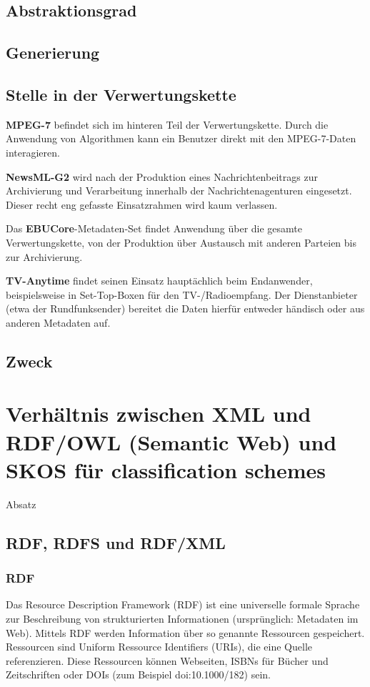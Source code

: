 	\subsection{Abstraktionsgrad}
	\subsection{Generierung}

	\subsection{Stelle in der Verwertungskette}
	\textbf{MPEG-7} befindet sich im hinteren Teil der Verwertungskette. Durch die Anwendung von Algorithmen kann ein Benutzer direkt mit den MPEG-7-Daten interagieren.
	
	\textbf{NewsML-G2} wird nach der Produktion eines Nachrichtenbeitrags zur Archivierung und Verarbeitung innerhalb der Nachrichtenagenturen eingesetzt. Dieser recht eng gefasste Einsatzrahmen wird kaum verlassen.
	
	Das \textbf{EBUCore}-Metadaten-Set findet Anwendung über die gesamte Verwertungskette, von der Produktion über Austausch mit anderen Parteien bis zur Archivierung.
	
	\textbf{TV-Anytime} findet seinen Einsatz hauptächlich beim Endanwender, beispielsweise in Set-Top-Boxen für den TV-/Radioempfang. Der Dienstanbieter (etwa der Rundfunksender) bereitet die Daten hierfür entweder händisch oder aus anderen Metadaten auf.

	\subsection{Zweck}
	
	\newpage
	\section{Verhältnis zwischen XML und RDF/OWL (Semantic Web) und SKOS für classification schemes}
	Absatz

	\subsection{RDF, RDFS und RDF/XML}
	\subsubsection{RDF}
	Das Resource Description Framework (RDF) ist eine universelle formale Sprache zur Beschreibung von strukturierten Informationen (ursprünglich: Metadaten im Web). Mittels RDF werden Information über so genannte Ressourcen gespeichert. Ressourcen sind Uniform Ressource Identifiers (URIs), die eine Quelle referenzieren. Diese Ressourcen können Webseiten, ISBNs für Bücher und Zeitschriften oder DOIs (zum Beispiel doi:10.1000/182) sein.
	
